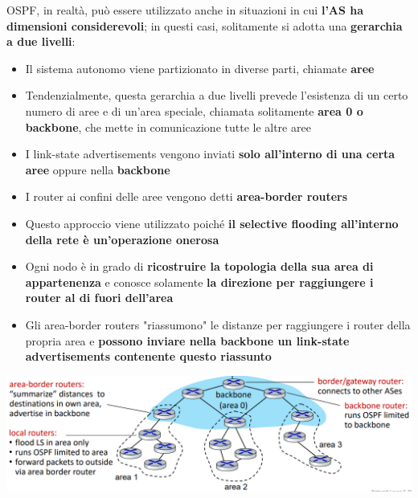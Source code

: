 \documentclass[12pt]{article}
\begin{document}
OSPF, in realtà, può essere utilizzato anche in situazioni in cui \textbf{l'AS ha dimensioni considerevoli}; in questi casi, solitamente si
adotta una \textbf{gerarchia a due livelli}:
\begin{itemize}
    \item Il sistema autonomo viene partizionato in diverse parti, chiamate \textbf{aree}
    \item Tendenzialmente, questa gerarchia a due livelli prevede l'esistenza di un certo numero di aree e di un'area speciale, chiamata solitamente \textbf{area 0 o backbone}, che mette in comunicazione tutte le altre aree
    \item I link-state advertisements vengono inviati \textbf{solo all'interno di una certa aree} oppure nella \textbf{backbone}
    \item I router ai confini delle aree vengono detti \textbf{area-border routers}
    \item Questo approccio viene utilizzato poiché \textbf{il selective flooding all'interno della rete è un'operazione onerosa}
    \item Ogni nodo è in grado di \textbf{ricostruire la topologia della sua area di appartenenza} e conosce solamente \textbf{la direzione per raggiungere i router al di fuori dell'area}
    \item Gli area-border routers "riassumono" le distanze per raggiungere i router della propria area e \textbf{possono inviare nella backbone un link-state advertisements contenente questo riassunto}
\end{itemize}
\begin{center}
    \includegraphics[width =1\linewidth]{Images/112.png}
\end{center}
\newpage
\end{document}
